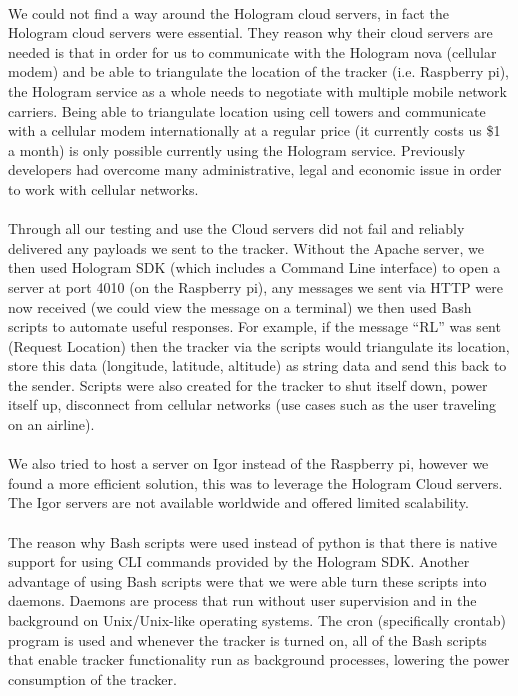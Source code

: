 \documentclass[12pt,a4paper]{article}
\begin{document}
        \paragraph{} We could not find a way around the Hologram cloud servers, in fact the Hologram cloud servers were essential. They reason why their cloud servers are needed is that in order for us to communicate with the Hologram nova (cellular modem) and be able to triangulate the location of the tracker (i.e. Raspberry pi), the Hologram service as a whole needs to negotiate with multiple mobile network carriers. Being able to triangulate location using cell towers and communicate with a cellular modem internationally at a regular price (it currently costs us \$1 a month) is only possible currently using the Hologram service. Previously developers had overcome many administrative, legal and economic issue in order to work with cellular networks.  
        
        \paragraph{} Through all our testing and use the Cloud servers did not fail and reliably delivered any payloads we sent to the tracker. Without the Apache server, we then used Hologram SDK (which includes a Command Line interface) to open a server at port 4010 (on the Raspberry pi), any messages we sent via HTTP were now received (we could view the message on a terminal) we then used Bash scripts to automate useful responses. For example, if the message “RL” was sent (Request Location) then the tracker via the scripts would triangulate its location, store this data (longitude, latitude, altitude) as string data and send this back to the sender. Scripts were also created for the tracker to shut itself down, power itself up, disconnect from cellular networks (use cases such as the user traveling on an airline).
        
        \paragraph{} We also tried to host a server on Igor instead of the Raspberry pi, however we found a more efficient solution, this was to leverage the Hologram Cloud servers. The Igor servers are not available worldwide and offered limited scalability. 
        
        \paragraph{} The reason why Bash scripts were used instead of python is that there is native support for using CLI commands provided by the Hologram SDK. Another advantage of using Bash scripts were that we were able turn these scripts into daemons. Daemons are process that run without user supervision and in the background on Unix/Unix-like operating systems. The cron (specifically crontab) program is used and whenever the tracker is turned on, all of the Bash scripts that enable tracker functionality run as background processes, lowering the power consumption of the tracker.
        
\end{document}
